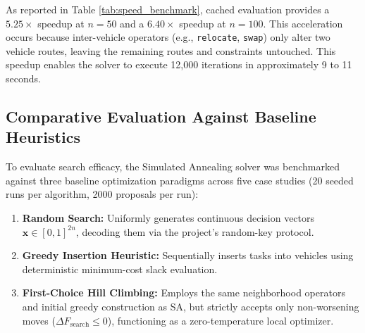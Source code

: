 As reported in Table \ref{tab:speed_benchmark}, cached evaluation provides a $5.25\times$ speedup at $n=50$ and a $6.40\times$ speedup at $n=100$. This acceleration occurs because inter-vehicle operators (e.g., \texttt{relocate}, \texttt{swap}) only alter two vehicle routes, leaving the remaining routes and constraints untouched. This speedup enables the solver to execute 12,000 iterations in approximately 9 to 11 seconds.

\subsection{Comparative Evaluation Against Baseline Heuristics}
To evaluate search efficacy, the Simulated Annealing solver was benchmarked against three baseline optimization paradigms across five case studies (20 seeded runs per algorithm, 2000 proposals per run):
\begin{enumerate}
    \item \textbf{Random Search:} Uniformly generates continuous decision vectors $\mathbf{x} \in [0, 1]^{2n}$, decoding them via the project's random-key protocol.
    \item \textbf{Greedy Insertion Heuristic:} Sequentially inserts tasks into vehicles using deterministic minimum-cost slack evaluation.
    \item \textbf{First-Choice Hill Climbing:} Employs the same neighborhood operators and initial greedy construction as SA, but strictly accepts only non-worsening moves ($\Delta F_{\text{search}} \le 0$), functioning as a zero-temperature local optimizer.
\end{enumerate}


